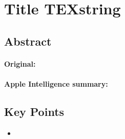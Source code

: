 \documentclass[a4paper,12pt]{article}
\begin{document}
\section{Title \texorpdfstring{TEXstring}{}}
\label{sec:}

\subsection{Abstract}

\paragraph{Original:}

\paragraph{Apple Intelligence summary:}


\subsection{Key Points}

\begin{itemize}
    \item 
\end{itemize}


\pagebreak
\printbibliography
\end{document}
